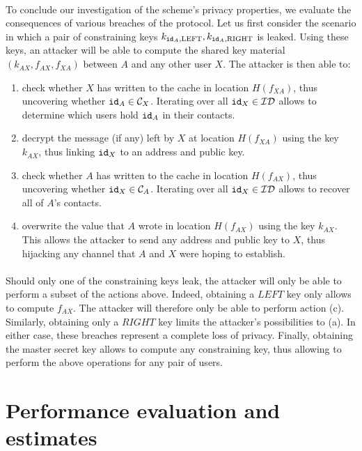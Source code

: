 	\paragraph{} To conclude our investigation of the scheme's privacy properties, we evaluate the consequences of various breaches of the protocol. Let us first consider the scenario in which a pair of constraining keys $k_{\mathtt{id}_A,\mathrm{LEFT}}, k_{\mathtt{id}_A,\mathrm{RIGHT}}$ is leaked. Using these keys, an attacker will be able to compute the shared key material $(k_{AX}, f_{AX}, f_{XA})$ between $A$ and any other user $X$. The attacker is then able to:
	\begin{enumerate}[label=(\alph*)]
		\item check whether $X$ has written to the cache in location $H(f_{XA})$, thus uncovering whether $\mathtt{id}_A \in \mathcal{C}_{X}$. Iterating over all $\mathtt{id}_X \in \mathcal{ID}$ allows to determine which users hold $\mathtt{id}_A$ in their contacts. 
		\item decrypt the message (if any) left by $X$ at location $H(f_{XA})$ using the key $k_{AX}$, thus linking $\mathtt{id}_X$ to an address and public key.
		\item check whether $A$ has written to the cache in location $H(f_{AX})$, thus uncovering whether $\mathtt{id}_X \in \mathcal{C}_{A}$. Iterating over all $\mathtt{id}_X \in \mathcal{ID}$ allows to recover all of $A$'s contacts.
		\item overwrite the value that $A$ wrote in location $H(f_{AX})$ using the key $k_{AX}$. This allows the attacker to send any address and public key to $X$, thus hijacking any channel that $A$ and $X$ were hoping to establish.
	\end{enumerate}
	
	\paragraph{} Should only one of the constraining keys leak, the attacker will only be able to perform a subset of the actions above. Indeed, obtaining a $LEFT$ key only allows to compute $f_{AX}$. The attacker will therefore only be able to perform action (c). Similarly, obtaining only a $RIGHT$ key limits the attacker's possibilities to (a). In either case, these breaches represent a complete loss of privacy. Finally, obtaining the master secret key allows to compute any constraining key, thus allowing to perform the above operations for any pair of users.



\section{Performance evaluation and estimates}
\label{sec:performance}



